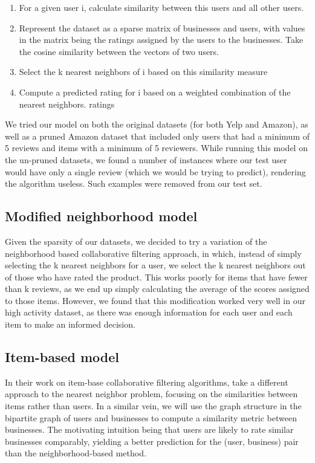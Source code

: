 \documentclass[letterpaper, 11 pt, conference]{ieeeconf}
\begin{document}
\begin{enumerate}
  \item For a given user i, calculate similarity between this users and all
    other users. 
  \item Represent the dataset as a sparse matrix of businesses and users, with
    values in the matrix being the ratings assigned by the users to the
    businesses. Take the cosine similarity between the vectors of two users.
  \item Select the k nearest neighbors of i based on this similarity measure
  \item Compute a predicted rating for i based on a weighted combination of the
    nearest neighbors. ratings
\end{enumerate}

We tried our model on both the original datasets (for both Yelp and
Amazon), as well as a pruned Amazon dataset that included only users that
had a minimum of 5 reviews and items with a minimum of 5 reviewers. While
running this model on the un-pruned datasets, we found a number of
instances where our test user would have only a single review (which we
would be trying to predict), rendering the algorithm useless. Such
examples were removed from our test set. 

\subsection{Modified neighborhood model}

Given the sparsity of our datasets, we decided to try a variation of the
neighborhood based collaborative filtering approach, in which, instead of
simply selecting the k nearest neighbors for a user, we select the k
nearest neighbors out of those who have rated the product. This works
poorly for items that have fewer than k reviews, as we end up simply
calculating the average of the scores assigned to those items. However, we
found that this modification worked very well in our high activity
dataset, as there was enough information for each user and each item to
make an informed decision. 

\subsection{Item-based model}

In their work on item-base collaborative filtering algorithms,
\cite{bib:sarwar} take a different approach to the nearest
neighbor problem, focusing on the similarities between items rather than
users. In a similar vein, we will use the graph structure in the bipartite
graph of users and businesses to compute a similarity metric between
businesses. The motivating intuition being that users are likely to rate
similar businesses comparably, yielding a better prediction for the (user,
business) pair than the neighborhood-based method.
\end{document}
